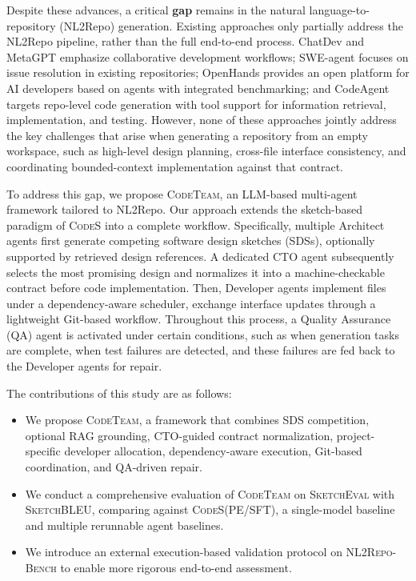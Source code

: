 \documentclass[format=acmsmall, review=false, screen=true]{acmart}
\newcommand{\tool}{\textsc{CodeTeam}\xspace}
\newcommand{\codes}{\textsc{CodeS}\xspace}
\newcommand{\sketcheval}{\textsc{SketchEval}\xspace}
\newcommand{\sketchbleu}{\textsc{SketchBLEU}\xspace}
\newcommand{\nlrepobench}{\textsc{NL2Repo-Bench}\xspace}
\begin{document}
Despite these advances, a critical \textbf{gap} remains in the natural language-to-repository (NL2Repo) generation. Existing approaches only partially address the NL2Repo pipeline, rather than the full end-to-end process. ChatDev and MetaGPT emphasize collaborative development workflows; SWE-agent focuses on issue resolution in existing repositories; OpenHands provides an open platform for AI developers based on agents with integrated benchmarking; and CodeAgent targets repo-level code generation with tool support for information retrieval, implementation, and testing. However, none of these approaches jointly address the key challenges that arise when generating a repository from an empty workspace, such as high-level design planning, cross-file interface consistency, and coordinating bounded-context implementation against that contract.

To address this gap, we propose \tool, an LLM-based multi-agent framework tailored to NL2Repo. Our approach extends the sketch-based paradigm of \codes into a complete workflow. Specifically, multiple Architect agents first generate competing software design sketches (SDSs), optionally supported by retrieved design references. A dedicated CTO agent subsequently selects the most promising design and normalizes it into a machine-checkable contract before code implementation. Then, Developer agents implement files under a dependency-aware scheduler, exchange interface updates through a lightweight Git-based workflow. Throughout this process, a Quality Assurance (QA) agent is activated under certain conditions, such as when generation tasks are complete, when test failures are detected, and these failures are fed back to the Developer agents for repair.

The contributions of this study are as follows: 
\begin{itemize}
    \item We propose \tool, a framework that combines SDS competition, optional RAG grounding, CTO-guided contract normalization, project-specific developer allocation, dependency-aware execution, Git-based coordination, and QA-driven repair. 
    \item We conduct a comprehensive evaluation of \tool on \sketcheval with \sketchbleu, comparing against \codes (PE/SFT), a single-model baseline and multiple rerunnable agent baselines. 
    \item We introduce an external execution-based validation protocol on \nlrepobench to enable more rigorous end-to-end assessment.
\end{itemize}
\end{document}
